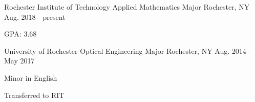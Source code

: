 \begin{cventries}
 \cventry
    {Rochester Institute of Technology}
    {Applied Mathematics Major}
    {Rochester, NY}
    {Aug. 2018 - present}
    {
      \begin{cvitems}
       \item{GPA: 3.68}
      \end{cvitems}
   }

  \cventry
    {University of Rochester}
    {Optical Engineering Major}
    {Rochester, NY}
    {Aug. 2014 - May 2017}
    {
      \begin{cvitems}
        \item {Minor in English}
        \item {Transferred to RIT}
      \end{cvitems}
   }

\end{cventries}
